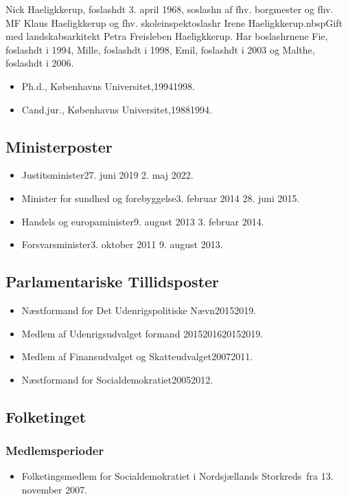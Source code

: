 \documentclass[11pt, a4paper]{awesome-cv}
\begin{document}
\makecvheader[R]
\makelettertitle
\begin{cvletter}
Nick Haeligkkerup, foslashdt 3. april 1968, soslashn af fhv. borgmester og fhv. MF Klaus Haeligkkerup og fhv. skoleinspektoslashr Irene Haeligkkerup.nbspGift med landskabsarkitekt Petra Freisleben Haeligkkerup. Har boslashrnene Fie, foslashdt i 1994, Mille, foslashdt i 1998, Emil, foslashdt i 2003 og Malthe, foslashdt i 2006.

\begin{itemize}
\item Ph.d., Københavns Universitet,19941998.
\item Cand.jur., Københavns Universitet,19881994.
\end{itemize}
\subsection*{Ministerposter}
\begin{itemize}
\item Justitsminister27. juni 2019  2. maj 2022.
\item Minister for sundhed og forebyggelse3. februar 2014  28. juni 2015.
\item Handels og europaminister9. august 2013  3. februar 2014.
\item Forsvarsminister3. oktober 2011  9. august 2013.
\end{itemize}
\subsection*{Parlamentariske Tillidsposter}
\begin{itemize}
\item Næstformand for Det Udenrigspolitiske Nævn20152019.
\item Medlem af Udenrigsudvalget formand 2015201620152019.
\item Medlem af Finansudvalget og Skatteudvalget20072011.
\item Næstformand for Socialdemokratiet20052012.
\end{itemize}
\subsection*{Folketinget}
\subsubsection*{Medlemsperioder}
\begin{itemize}
\item Folketingsmedlem for Socialdemokratiet i Nordsjællands Storkreds fra 13. november 2007.
\end{itemize}

\end{cvletter}
\end{document}
